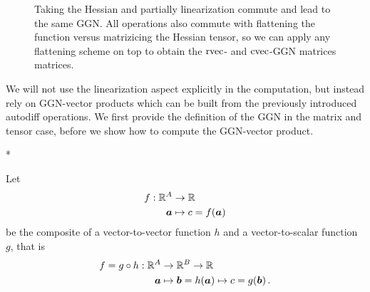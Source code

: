 \begin{figure}[!h]
  \centering
  \caption{Taking the Hessian and partially linearization commute and lead to the same GGN. All operations also commute with flattening the function versus matrizicing the Hessian tensor, so we can apply any flattening scheme on top to obtain the $\operatorname{rvec}$- and $\operatorname{cvec}$-GGN matrices matrices.}
\end{figure}

We will not use the linearization aspect explicitly in the computation, but instead rely on GGN-vector products which can be built from the previously introduced autodiff operations.
We first provide the definition of the GGN in the matrix and tensor case, before we show how to compute the GGN-vector product.

\switchcolumn[1]*
\switchcolumn[0]

\begin{setup}\label{setup:composite_vector_to_vector_to_scalar_function}
  Let
  \begin{align*}
    f: {\mathbb{R}}^{A} &\to {\mathbb{R}}
    \\
    {\bm{a}} &\mapsto c = f({\bm{a}})
  \end{align*}
  be the composite of a vector-to-vector function $h$ and a vector-to-scalar function $g$, that is
  \begin{align*}
    f = g \circ h: {\mathbb{R}}^A &\to {\mathbb{R}}^B \to {\mathbb{R}}
    \\
    {\bm{a}} &\mapsto {\bm{b}} = h({\bm{a}}) \mapsto c = g({\bm{b}})\,.
  \end{align*}
\end{setup}

